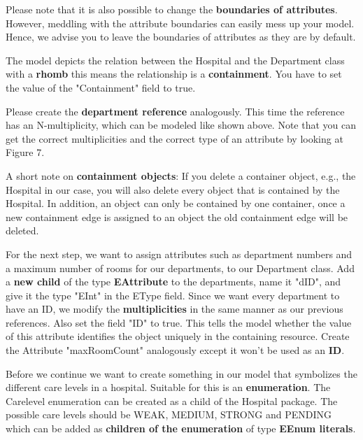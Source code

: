 Please note that it is also possible to change the \textbf{boundaries of attributes}. However, meddling with the attribute boundaries can easily mess up your model. Hence, we advise you to leave the boundaries of attributes as they are by default.\newline

The model depicts the relation between the Hospital and the Department class with a \textbf{rhomb} this means the relationship is a \textbf{containment}. You have to set the value of the \textsf{"Containment"} field to \textsf{true}.\newline

Please create the \textbf{department reference} analogously. This time the reference has an N-multiplicity, which can be modeled like shown above. Note that you can get the correct multiplicities and the correct type of an attribute by looking at Figure 7.\newline

A short note on \textbf{containment objects}: If you delete a container object, e.g., the Hospital in our case, you will also delete every object that is contained by the Hospital. In addition, an object can only be contained by one container, once a new containment edge is assigned to an object the old containment edge will be deleted.\newline

For the next step, we want to assign attributes such as department numbers and a maximum number of rooms for our departments, to our Department class. Add a \textbf{new child} of the type \textbf{EAttribute} to the departments, name it \textsf{"dID"}, and give it the type \textsf{"EInt"} in the EType field. Since we want every department to have an ID, we modify the \textbf{multiplicities} in the same manner as our previous references.
Also set the field \textsf{"ID"} to \textsf{true}. This tells the model whether the value of this attribute identifies the object uniquely in the containing resource.
\newline
Create the Attribute \textsf{"maxRoomCount"} analogously except it won't be used as an \textbf{ID}.\newline

Before we continue we want to create something in our model that symbolizes the different care levels in a hospital. Suitable for this is an \textbf{enumeration}. The \textsf{Carelevel} enumeration can be created as a child of the Hospital package. The possible care levels should be \textsf{WEAK}, \textsf{MEDIUM}, \textsf{STRONG} and \textsf{PENDING} which can be added as \textbf{children of the enumeration} of type \textbf{EEnum literals}.\newline

